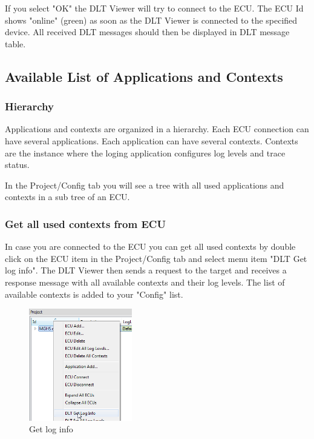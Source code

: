 \documentclass[a4paper,11pt]{article}
\begin{document}
If you select "OK" the DLT Viewer will try to connect to the ECU.
The ECU Id shows "online" (green) as soon as the DLT Viewer is connected to the
specified device.
All received DLT messages should then be displayed in DLT message table.

\pagebreak

\subsection{Available List of Applications and Contexts}


\subsubsection{Hierarchy}

Applications and contexts are organized in a hierarchy. Each ECU connection can have
several applications. Each application can have several contexts. Contexts are the instance
where the loging application configures log levels and trace status.

In the Project/Config tab you will see a tree with all used applications and contexts in a sub
tree of an ECU.

\subsubsection{Get all used contexts from ECU}

\label{getallcontexts}
In case you are connected to the ECU you can get all used contexts by double click on the
ECU item in the Project/Config tab and select menu item "DLT Get log info".
The DLT Viewer then sends a request to the target and receives a response message
with all available contexts and their log levels. The list of available contexts is added
to your "Config" list.

\begin{figure}[H]
 \centering
  \includegraphics[width=0.4\textwidth]{images/getloginfo.png}
 \caption{Get log info}
 \label{fig:getloginfo}
\end{figure}
\end{document}
